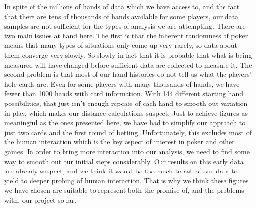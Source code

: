 \documentclass[11pt]{article}
\begin{document}
In spite of the millions of hands of data which we have access to, and the fact
that there are tens of thousands of hands available for some players, our data
samples are not sufficient for the types of analysis we are attempting. There
are two main issues at hand here. The first is that the inherent randomness of
poker means that many types of situations only come up very rarely, so data
about them converge very slowly. So slowly in fact that it is probable that
what is being measured will have changed before sufficient data are collected
to measure it. The second problem is that most of our hand histories do not
tell us what the players’ hole cards are. Even for some players with many
thousands of hands, we have fewer than 1000 hands with card information.
With 144 different starting hand possibilities, that just isn’t enough repeats
of each hand to smooth out variation in play, which makes our distance
calculations suspect.
Just to achieve figures as meaningful as the ones presented here, we have
had to simplify our approach to just two cards and the first round of betting.
Unfortunately, this excludes most of the human interaction which is the
key aspect of interest in poker and other games. In order to bring more
interaction into our analysis, we need to find some way to smooth out our
initial steps considerably. Our results on this early data are already suspect,
and we think it would be too much to ask of our data to yield to deeper
probing of human interaction.
That is why we think these figures we have chosen are suitable to represent
both the promise of, and the problems with, our project so far.
\end{document}
